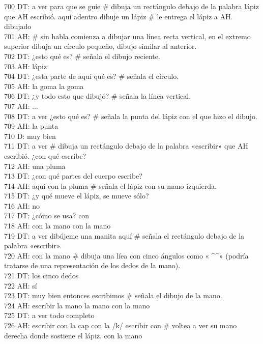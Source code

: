 700 DT: a ver para que se guíe # dibuja un rectángulo debajo de la palabra lápiz que AH escribió. aquí adentro dibuje un lápiz # le entrega el lápiz a AH. dibujado\\
701 AH: # sin habla comienza a dibujar una línea recta vertical, en el extremo superior dibuja un círculo pequeño, dibujo similar al anterior.\\
702 DT: ¿esto qué es? # señala el dibujo reciente.\\
703 AH: lápiz\\
704 DT: ¿esta parte de aquí qué es? # señala el círculo.\\
705 AH: la goma la goma\\
706 DT: ¿y todo esto que dibujó? # señala la línea vertical.\\
707 AH: ...\\
708 DT: a ver ¿esto qué es? # señala la punta del lápiz con el que hizo el dibujo.\\
709 AH: la punta\\
710 D: muy bien\\
711 DT: a ver # dibuja un rectángulo debajo de la palabra «escribir» que AH escribió. ¿con qué escribe?\\
712 AH: una pluma\\
713 DT: ¿con qué partes del cuerpo escribe?\\
714 AH: aquí con la pluma # señala el lápiz con su mano izquierda.\\
715 DT: ¿y qué mueve el lápiz, se mueve sólo?\\
716 AH: no\\
717 DT: ¿cómo se usa? con\\
718 AH: con la mano con la mano\\
719 DT: a ver dibújeme una manita aquí # señala el rectángulo debajo de la palabra «escribir».\\
720 AH: con la mano # dibuja una líea con cinco ángulos como «^^^^^» (podría tratarse de una representación de los dedos de la mano).\\
721 DT: los cinco dedos\\
722 AH: sí\\
723 DT: muy bien entonces escribimos # señala el dibujo de la mano.\\
724 AH: escribir la mano la mano con la mano\\
725 DT: a ver todo completo\\
726 AH: escribir con la cap con la /k/ escribir con # voltea a ver su mano derecha donde sostiene el lápiz. con la mano\\
